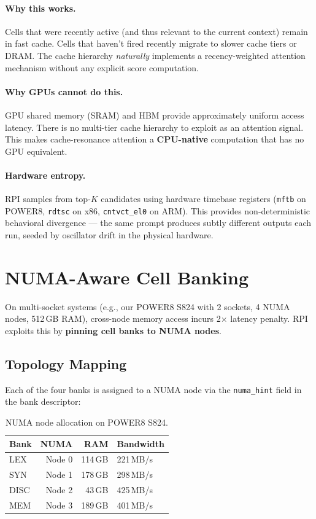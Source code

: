 \documentclass[10pt,twocolumn]{article}
\begin{document}
\paragraph{Why this works.} Cells that were recently active (and thus relevant to the current context) remain in fast cache. Cells that haven't fired recently migrate to slower cache tiers or DRAM. The cache hierarchy \emph{naturally} implements a recency-weighted attention mechanism without any explicit score computation.

\paragraph{Why GPUs cannot do this.} GPU shared memory (SRAM) and HBM provide approximately uniform access latency. There is no multi-tier cache hierarchy to exploit as an attention signal. This makes cache-resonance attention a \textbf{CPU-native} computation that has no GPU equivalent.

\paragraph{Hardware entropy.} RPI samples from top-$K$ candidates using hardware timebase registers (\texttt{mftb} on POWER8, \texttt{rdtsc} on x86, \texttt{cntvct\_el0} on ARM). This provides non-deterministic behavioral divergence --- the same prompt produces subtly different outputs each run, seeded by oscillator drift in the physical hardware.

\section{NUMA-Aware Cell Banking}
\label{sec:numa}

On multi-socket systems (e.g., our POWER8 S824 with 2 sockets, 4 NUMA nodes, 512\,GB RAM), cross-node memory access incurs 2$\times$ latency penalty. RPI exploits this by \textbf{pinning cell banks to NUMA nodes}.

\subsection{Topology Mapping}

Each of the four banks is assigned to a NUMA node via the \texttt{numa\_hint} field in the bank descriptor:

\begin{table}[h]
\centering
\small
\begin{tabular}{lrrl}
\toprule
\textbf{Bank} & \textbf{NUMA} & \textbf{RAM} & \textbf{Bandwidth} \\
\midrule
LEX & Node 0 & 114\,GB & 221\,MB/s \\
SYN & Node 1 & 178\,GB & 298\,MB/s \\
DISC & Node 2 & 43\,GB & 425\,MB/s \\
MEM & Node 3 & 189\,GB & 401\,MB/s \\
\bottomrule
\end{tabular}
\caption{NUMA node allocation on POWER8 S824.}
\label{tab:numa}
\end{table}
\end{document}
